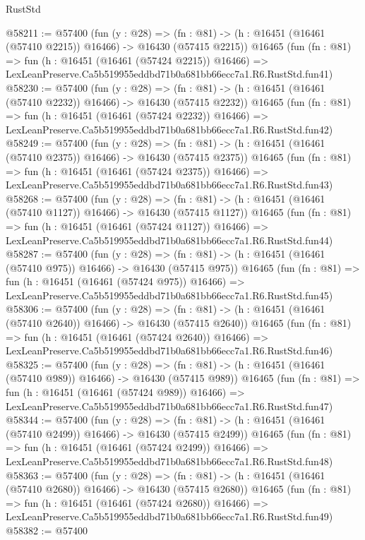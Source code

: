 \begin{lexlean}{RustStd}
\begin{coremodule}
@58211 := @57400
    (fun (y : @28) =>
    (fn : @81) -> (h : @16451 (@16461 (@57410 @2215)) @16466) -> @16430 (@57415 @2215))
    @16465
    (fun (fn : @81) =>
    fun (h : @16451 (@16461 (@57424 @2215)) @16466) =>
    LexLeanPreserve.Ca5b519955eddbd71b0a681bb66ecc7a1.R6.RustStd.fun41)
@58230 := @57400
    (fun (y : @28) =>
    (fn : @81) -> (h : @16451 (@16461 (@57410 @2232)) @16466) -> @16430 (@57415 @2232))
    @16465
    (fun (fn : @81) =>
    fun (h : @16451 (@16461 (@57424 @2232)) @16466) =>
    LexLeanPreserve.Ca5b519955eddbd71b0a681bb66ecc7a1.R6.RustStd.fun42)
@58249 := @57400
    (fun (y : @28) =>
    (fn : @81) -> (h : @16451 (@16461 (@57410 @2375)) @16466) -> @16430 (@57415 @2375))
    @16465
    (fun (fn : @81) =>
    fun (h : @16451 (@16461 (@57424 @2375)) @16466) =>
    LexLeanPreserve.Ca5b519955eddbd71b0a681bb66ecc7a1.R6.RustStd.fun43)
@58268 := @57400
    (fun (y : @28) =>
    (fn : @81) -> (h : @16451 (@16461 (@57410 @1127)) @16466) -> @16430 (@57415 @1127))
    @16465
    (fun (fn : @81) =>
    fun (h : @16451 (@16461 (@57424 @1127)) @16466) =>
    LexLeanPreserve.Ca5b519955eddbd71b0a681bb66ecc7a1.R6.RustStd.fun44)
@58287 := @57400
    (fun (y : @28) =>
    (fn : @81) -> (h : @16451 (@16461 (@57410 @975)) @16466) -> @16430 (@57415 @975))
    @16465
    (fun (fn : @81) =>
    fun (h : @16451 (@16461 (@57424 @975)) @16466) =>
    LexLeanPreserve.Ca5b519955eddbd71b0a681bb66ecc7a1.R6.RustStd.fun45)
@58306 := @57400
    (fun (y : @28) =>
    (fn : @81) -> (h : @16451 (@16461 (@57410 @2640)) @16466) -> @16430 (@57415 @2640))
    @16465
    (fun (fn : @81) =>
    fun (h : @16451 (@16461 (@57424 @2640)) @16466) =>
    LexLeanPreserve.Ca5b519955eddbd71b0a681bb66ecc7a1.R6.RustStd.fun46)
@58325 := @57400
    (fun (y : @28) =>
    (fn : @81) -> (h : @16451 (@16461 (@57410 @989)) @16466) -> @16430 (@57415 @989))
    @16465
    (fun (fn : @81) =>
    fun (h : @16451 (@16461 (@57424 @989)) @16466) =>
    LexLeanPreserve.Ca5b519955eddbd71b0a681bb66ecc7a1.R6.RustStd.fun47)
@58344 := @57400
    (fun (y : @28) =>
    (fn : @81) -> (h : @16451 (@16461 (@57410 @2499)) @16466) -> @16430 (@57415 @2499))
    @16465
    (fun (fn : @81) =>
    fun (h : @16451 (@16461 (@57424 @2499)) @16466) =>
    LexLeanPreserve.Ca5b519955eddbd71b0a681bb66ecc7a1.R6.RustStd.fun48)
@58363 := @57400
    (fun (y : @28) =>
    (fn : @81) -> (h : @16451 (@16461 (@57410 @2680)) @16466) -> @16430 (@57415 @2680))
    @16465
    (fun (fn : @81) =>
    fun (h : @16451 (@16461 (@57424 @2680)) @16466) =>
    LexLeanPreserve.Ca5b519955eddbd71b0a681bb66ecc7a1.R6.RustStd.fun49)
@58382 := @57400

\end{coremodule}
\end{lexlean}
